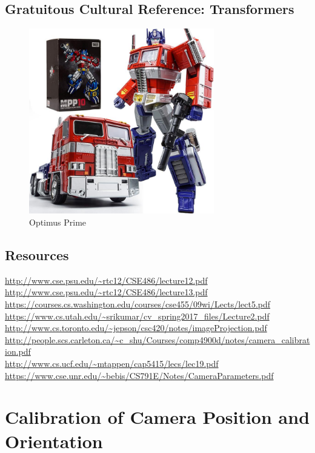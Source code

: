 \documentclass{article}
\begin{document}
\subsection{Gratuitous Cultural Reference: Transformers}
\begin{figure}[H]
\includegraphics[width=0.72\textwidth]{optimus_prime.jpg}
\centering
\caption*{Optimus Prime}
\end{figure}

\subsection{Resources}
\url{http://www.cse.psu.edu/~rtc12/CSE486/lecture12.pdf} \\
\url{http://www.cse.psu.edu/~rtc12/CSE486/lecture13.pdf} \\
\url{https://courses.cs.washington.edu/courses/cse455/09wi/Lects/lect5.pdf} \\
\url{https://www.cs.utah.edu/~srikumar/cv_spring2017_files/Lecture2.pdf} \\
\url{http://www.cs.toronto.edu/~jepson/csc420/notes/imageProjection.pdf} \\
\url{http://people.scs.carleton.ca/~c_shu/Courses/comp4900d/notes/camera_calibration.pdf} \\
\url{http://www.cs.ucf.edu/~mtappen/cap5415/lecs/lec19.pdf} \\
\url{https://www.cse.unr.edu/~bebis/CS791E/Notes/CameraParameters.pdf} \\

\newpage
\section{Calibration of Camera Position and Orientation}
\end{document}
